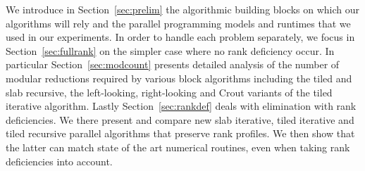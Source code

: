 \documentclass{article}
\begin{document}
 
 
 

We introduce in Section~\ref{sec:prelim} the algorithmic building blocks on
which our algorithms will rely and the parallel programming models and runtimes
that we used in our experiments.
In order to handle each problem separately, we focus in
Section~\ref{sec:fullrank} on the simpler case where no rank deficiency
occur. In particular Section~\ref{sec:modcount} presents detailed analysis of the
number of modular reductions required by various block algorithms including the tiled
and slab recursive, the left-looking, right-looking and Crout variants of the
tiled iterative algorithm. Lastly Section~\ref{sec:rankdef}  deals with elimination
with rank deficiencies. We there present and compare new slab iterative,
tiled iterative and tiled recursive parallel algorithms that preserve
rank profiles. We then show that the latter can match state of the art
numerical routines, even when taking rank deficiencies into account.

 
 
 
 
 
 
 
 
 
 
 
 
 
 

 
 
 
 
 
 
 
 
 
 

 
 
 
 
 
 
 
 
 
 
 
 
 
 

 
 
 
 
 
 
 
 
 
 
 
 
 
 
 
 
 
 
 
 
 
 
 
 
 
 
 
 
 
 
\end{document}
